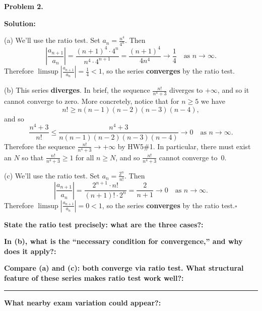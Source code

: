 \documentclass[12pt]{article}
\newcommand{\fillfield}[1]{%
  \par\noindent\textbf{#1:}\enspace\hrulefill\par\vspace{3pt}%
}
\newcommand{\fillfieldlong}[1]{%
  \par\noindent\textbf{#1:}\par\vspace{1.5cm}%
  \noindent\rule{\linewidth}{0.35pt}\par\vspace{4pt}%
}
\begin{document}
\newpage

\begin{tcolorbox}[
  enhanced, breakable,
  colback  = solgreen,
  colframe = green!45!black,
  fonttitle = \bfseries,
  title = {\textsc{Official Solution}\hfill Homework 7 -- Solutions}
]
\textbf{Problem 2.}

\medskip\textbf{Solution:}

\medskip
(a) We'll use the ratio test. Set $a_n = \frac{n^4}{4^n}$. Then
\[
  \left|\frac{a_{n+1}}{a_n}\right|
  = \frac{(n+1)^4 \cdot 4^n}{n^4 \cdot 4^{n+1}}
  = \frac{(n+1)^4}{4n^4}
  \to \frac{1}{4} \quad\text{as } n\to\infty.
\]
Therefore $\limsup\left|\frac{a_{n+1}}{a_n}\right| = \frac{1}{4} < 1$, so the series
\textbf{converges} by the ratio test.

\medskip
(b) This series \textbf{diverges}.
In brief, the sequence $\frac{n!}{n^4+3}$ diverges to $+\infty$, and so it cannot converge
to zero.
More concretely, notice that for $n \geq 5$ we have
\[
  n! \geq n(n-1)(n-2)(n-3)(n-4),
\]
and so
\[
  \frac{n^4+3}{n!}
  \leq \frac{n^4+3}{n(n-1)(n-2)(n-3)(n-4)}
  \to 0 \quad\text{as } n\to\infty.
\]
Therefore the sequence $\frac{n!}{n^4+3} \to +\infty$ by HW5\#1.
In particular, there must exist an $N$ so that $\frac{n!}{n^4+3} \geq 1$ for all
$n \geq N$, and so $\frac{n!}{n^4+3}$ cannot converge to~$0$.

\medskip
(c) We'll use the ratio test. Set $a_n = \frac{2^n}{n!}$. Then
\[
  \left|\frac{a_{n+1}}{a_n}\right|
  = \frac{2^{n+1} \cdot n!}{(n+1)!\cdot 2^n}
  = \frac{2}{n+1}
  \to 0 \quad\text{as } n\to\infty.
\]
Therefore $\limsup\left|\frac{a_{n+1}}{a_n}\right| = 0 < 1$, so the series
\textbf{converges} by the ratio test.\hfill$\square$
\end{tcolorbox}

\bigskip

\begin{tcolorbox}[
  enhanced, breakable,
  colback  = reflectcyan,
  colframe = cyan!55!black,
  fonttitle = \bfseries,
  title = {\textsc{Reflection \& Variation}}
]
\fillfield{State the ratio test precisely: what are the three cases?}
\fillfield{In (b), what is the ``necessary condition for convergence,'' and why does it apply?}
\fillfieldlong{Compare (a) and (c): both converge via ratio test. What structural feature of these series makes ratio test work well?}
\fillfield{What nearby exam variation could appear?}
\end{tcolorbox}

\newpage
\end{document}
